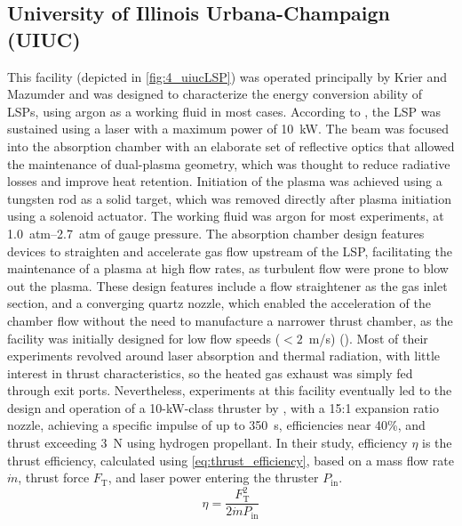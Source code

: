         \subsection{University of Illinois Urbana-Champaign (UIUC)}
            This facility (depicted in \autoref{fig:4_uiucLSP}) was operated principally by Krier and Mazumder and was designed to characterize the energy conversion ability of LSPs, using argon as a working fluid in most cases. According to \textcite{schwartzLasersustainedGasPlasmas1989}, the LSP was sustained using a  laser with a maximum power of \qty{10}{kW}. The beam was focused into the absorption chamber with an elaborate set of reflective optics that allowed the maintenance of dual-plasma geometry, which was thought to reduce radiative losses and improve heat retention. Initiation of the plasma was achieved using a tungsten rod as a solid target, which was removed directly after plasma initiation using a solenoid actuator. The working fluid was argon for most experiments, at \qtyrange{1.0}{2.7}{atm} of gauge pressure. The absorption chamber design features devices to straighten and accelerate gas flow upstream of the LSP, facilitating the maintenance of a plasma at high flow rates, as turbulent flow were prone to blow out the plasma. These design features include a flow straightener as the gas inlet section, and a converging quartz nozzle, which enabled the acceleration of the chamber flow without the need to manufacture a narrower thrust chamber, as the facility was initially designed for low flow speeds ($< 2$~m/s) (\textcite{krierEnergyConversionMeasurements1988}). Most of their experiments revolved around laser absorption and thermal radiation, with little interest in thrust characteristics, so the heated gas exhaust was simply fed through exit ports. Nevertheless, experiments at this facility eventually led to the design and operation of a 10-kW-class thruster by \textcite{blackLaserPropulsion10kW1995}, with a 15:1 expansion ratio nozzle, achieving a specific impulse of up to 350~s, efficiencies near 40\%, and thrust exceeding 3~N using hydrogen propellant. In their study, efficiency $\eta$ is the thrust efficiency, calculated using \autoref{eq:thrust_efficiency}, based on a mass flow rate $\dot{m}$, thrust force $F_\mathrm{T}$, and laser power entering the thruster $P_\mathrm{in}$.
            \begin{equation} \label{eq:thrust_efficiency}
                \eta = \frac{F_\mathrm{T}^2}{2\dot{m}P_\mathrm{in}}
            \end{equation}
